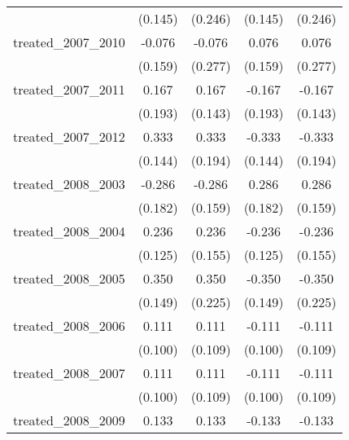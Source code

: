 {\begin{tabular}{l*{4}{c}}
            &     (0.145)         &     (0.246)         &     (0.145)         &     (0.246)         \\
[1em]
treated\_2007\_2010&      -0.076         &      -0.076         &       0.076         &       0.076         \\
            &     (0.159)         &     (0.277)         &     (0.159)         &     (0.277)         \\
[1em]
treated\_2007\_2011&       0.167         &       0.167         &      -0.167         &      -0.167         \\
            &     (0.193)         &     (0.143)         &     (0.193)         &     (0.143)         \\
[1em]
treated\_2007\_2012&       0.333\sym{*}  &       0.333         &      -0.333\sym{*}  &      -0.333         \\
            &     (0.144)         &     (0.194)         &     (0.144)         &     (0.194)         \\
[1em]
treated\_2008\_2003&      -0.286         &      -0.286         &       0.286         &       0.286         \\
            &     (0.182)         &     (0.159)         &     (0.182)         &     (0.159)         \\
[1em]
treated\_2008\_2004&       0.236         &       0.236         &      -0.236         &      -0.236         \\
            &     (0.125)         &     (0.155)         &     (0.125)         &     (0.155)         \\
[1em]
treated\_2008\_2005&       0.350\sym{*}  &       0.350         &      -0.350\sym{*}  &      -0.350         \\
            &     (0.149)         &     (0.225)         &     (0.149)         &     (0.225)         \\
[1em]
treated\_2008\_2006&       0.111         &       0.111         &      -0.111         &      -0.111         \\
            &     (0.100)         &     (0.109)         &     (0.100)         &     (0.109)         \\
[1em]
treated\_2008\_2007&       0.111         &       0.111         &      -0.111         &      -0.111         \\
            &     (0.100)         &     (0.109)         &     (0.100)         &     (0.109)         \\
[1em]
treated\_2008\_2009&       0.133         &       0.133         &      -0.133         &      -0.133         \\

\end{tabular}}
